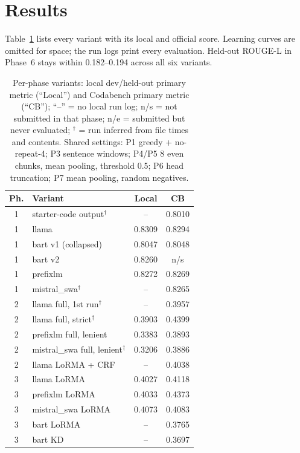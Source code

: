 \documentclass[11pt, oneside]{article}
\begin{document}
\section{Results}
Table~\ref{tab:variants} lists every variant with its local and official score. Learning curves are omitted for space; the run logs print every evaluation. Held-out ROUGE-L in Phase~6 stays within 0.182--0.194 across all six variants.

\begin{table}[t]
\centering
\scriptsize
\caption{Per-phase variants: local dev/held-out primary metric (``Local'') and Codabench primary metric (``CB''); ``--'' = no local run log; n/s = not submitted in that phase; n/e = submitted but never evaluated; $^\dagger$ = run inferred from file times and contents. Shared settings: P1 greedy + no-repeat-4; P3 sentence windows; P4/P5 8 even chunks, mean pooling, threshold 0.5; P6 head truncation; P7 mean pooling, random negatives.}
\label{tab:variants}
\setlength{\tabcolsep}{3pt}
\begin{tabular}[t]{c l c c}
\toprule
Ph. & Variant & Local & CB \\
\midrule
1 & starter-code output$^\dagger$ & -- & 0.8010 \\
1 & llama & 0.8309 & 0.8294 \\
1 & bart v1 (collapsed) & 0.8047 & 0.8048 \\
1 & bart v2 & 0.8260 & n/s \\
1 & prefixlm & 0.8272 & 0.8269 \\
1 & mistral\_swa$^\dagger$ & -- & 0.8265 \\
\midrule
2 & llama full, 1st run$^\dagger$ & -- & 0.3957 \\
2 & llama full, strict$^\dagger$ & 0.3903 & 0.4399 \\
2 & prefixlm full, lenient & 0.3383 & 0.3893 \\
2 & mistral\_swa full, lenient$^\dagger$ & 0.3206 & 0.3886 \\
2 & llama LoRMA + CRF & -- & 0.4038 \\
\midrule
3 & llama LoRMA & 0.4027 & 0.4118 \\
3 & prefixlm LoRMA & 0.4033 & 0.4373 \\
3 & mistral\_swa LoRMA & 0.4073 & 0.4083 \\
3 & bart LoRMA & -- & 0.3765 \\
3 & bart KD & -- & 0.3697 \\

\end{tabular}
\end{table}
\end{document}
